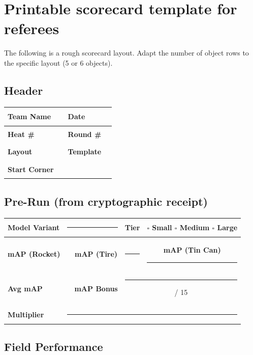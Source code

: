 \documentclass[a4]{article}
\begin{document}
\section*{Printable scorecard template for referees} 
The following is a rough scorecard layout. Adapt the number of object rows to the specific layout (5 or 6 objects).

\subsection*{Header}

\begin{table}[H]
\centering
\begin{tabular}{|l|p{5cm}|l|p{3cm}|}
\hline
\textbf{Team Name} & \rule{5cm}{0.4pt} & \textbf{Date} & \rule{3cm}{0.4pt} \\
\hline
\textbf{Heat \#} & \rule{5cm}{0.4pt} & \textbf{Round \#} & \rule{3cm}{0.4pt} \\
\hline
\textbf{Layout} & \rule{5cm}{0.4pt} & \textbf{Template} & \rule{3cm}{0.4pt} \\
\hline
\textbf{Start Corner} & \rule{5cm}{0.4pt} & & \\
\hline
\end{tabular}
\end{table}

\subsection*{Pre-Run (from cryptographic receipt)}

\begin{table}[H]
\centering
\begin{tabular}{|l|c|c|c|c|}
\hline
\textbf{Model Variant} & \multicolumn{2}{c|}{\rule{3cm}{0.4pt}} & \textbf{Tier} & $\square$ Small \quad $\square$ Medium \quad $\square$ Large \\
\hline
\textbf{mAP (Rocket)} & \rule{2cm}{0.4pt} & \textbf{mAP (Tire)} & \rule{2cm}{0.4pt} & \textbf{mAP (Tin Can)} \quad \rule{2cm}{0.4pt} \\
\hline
\textbf{Avg mAP} & \rule{2cm}{0.4pt} & \textbf{mAP Bonus} & \multicolumn{2}{c|}{\rule{2cm}{0.4pt} / 15} \\
\hline
\textbf{Multiplier} & \multicolumn{4}{c|}{\rule{2cm}{0.4pt}} \\
\hline
\end{tabular}
\end{table}

\subsection*{Field Performance}
\end{document}
